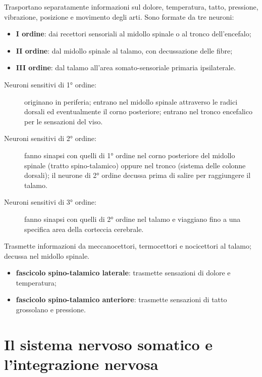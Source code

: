 Trasportano separatamente informazioni sul dolore, temperatura, tatto,
pressione, vibrazione, posizione e movimento degli arti. Sono formate da
tre neuroni:
\begin{itemize}
  \item \textbf{I ordine}: dai recettori sensoriali al midollo spinale o
    al tronco dell'encefalo;
  \item \textbf{II ordine}: dal midollo spinale al talamo, con
    decussazione delle fibre;
  \item \textbf{III ordine}: dal talamo all'area somato-sensoriale
    primaria ipsilaterale.
\end{itemize}

\begin{description}
  \item[Neuroni sensitivi di 1° ordine:] originano in periferia; entrano
    nel midollo spinale attraverso le radici dorsali ed eventualmente il
    corno posteriore; entrano nel tronco encefalico per le sensazioni del
    viso.
  \item[Neuroni sensitivi di 2° ordine:] fanno sinapsi con quelli di 1°
    ordine nel corno posteriore del midollo spinale (tratto
    spino-talamico) oppure nel tronco (sistema delle colonne dorsali); il
    neurone di 2° ordine decussa prima di salire per raggiungere il
    talamo.
  \item[Neuroni sensitivi di 3° ordine:] fanno sinapsi con quelli di 2°
    ordine nel talamo e viaggiano fino a una specifica area della
    corteccia cerebrale.
\end{description}

Trasmette informazioni da meccanocettori, termocettori e nocicettori al
talamo; decussa nel midollo spinale.
\begin{itemize}
  \item \textbf{fascicolo spino-talamico laterale}: trasmette sensazioni
    di dolore e temperatura;
  \item \textbf{fascicolo spino-talamico anteriore}: trasmette sensazioni
    di tatto grossolano e pressione.
\end{itemize}

\section{Il sistema nervoso somatico e l'integrazione nervosa}

